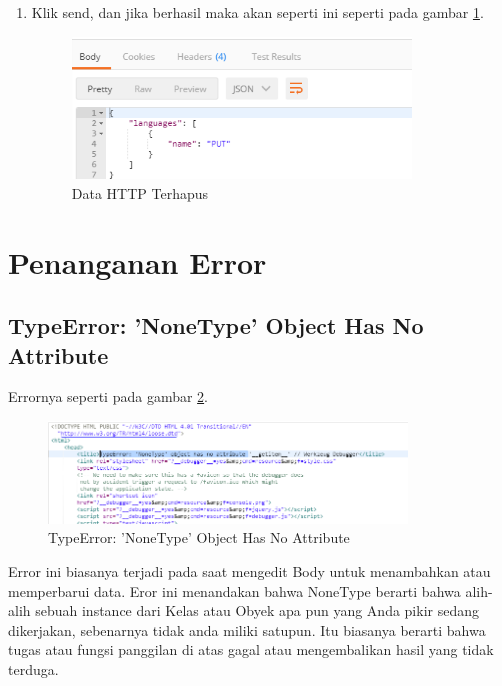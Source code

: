 \begin{enumerate}
\item Klik send, dan jika berhasil maka akan seperti ini seperti pada gambar \ref{fig:dhh}.
\begin{figure}[!htbp]
	\centerline{\includegraphics[width=0.85\textwidth]{figures/11/dhh.PNG}}
	\caption{Data HTTP Terhapus}
	\label{fig:dhh}
\end{figure}
\end{enumerate}

\section{Penanganan Error}
\subsection{TypeError: 'NoneType' Object Has No Attribute}
Errornya seperti pada gambar \ref{fig:nte}.
\begin{figure}[!htbp]
	\centerline{\includegraphics[width=0.85\textwidth]{figures/11/nte.PNG}}
	\caption{TypeError: 'NoneType' Object Has No Attribute}
	\label{fig:nte}
\end{figure}

Error ini biasanya terjadi pada saat mengedit  Body untuk menambahkan atau memperbarui data. Eror ini menandakan bahwa NoneType berarti bahwa alih-alih sebuah instance dari Kelas atau Obyek apa pun yang Anda pikir sedang dikerjakan, sebenarnya tidak anda miliki satupun. Itu biasanya berarti bahwa tugas atau fungsi panggilan di atas gagal atau mengembalikan hasil yang tidak terduga.

